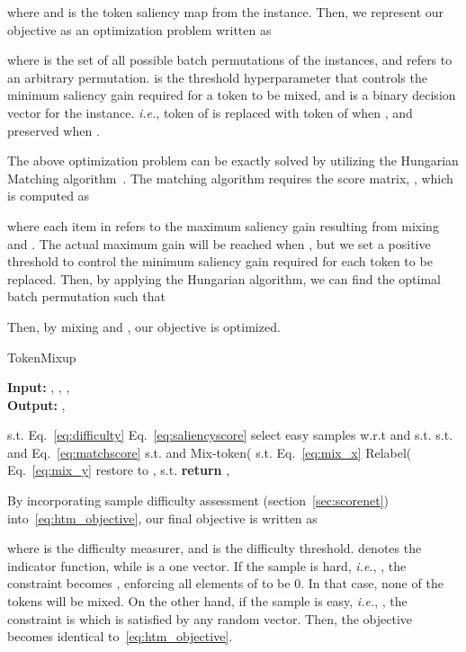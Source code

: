 \documentclass{article}
\begin{document}
where  and  is the token saliency map from the  instance.
Then, we represent our objective as an optimization problem written as

where  is the set of all possible batch permutations of the  instances, and  refers to an arbitrary permutation.
 is the threshold hyperparameter that controls the minimum saliency gain required for a token to be mixed, and  is a binary decision vector for the  instance. 
\textit{i.e.}, token  of  is replaced with token  of  when , and preserved when .

The above optimization problem can be exactly solved by utilizing the Hungarian Matching algorithm~\cite{munkres1957algorithms}.
The matching algorithm requires the score matrix, , which is computed as

where each item in  refers to the maximum saliency gain resulting from mixing  and .
The actual maximum gain will be reached when , but we set a positive threshold to control the minimum saliency gain required for each token to be replaced.
Then, by applying the Hungarian algorithm, we can find the optimal batch permutation  such that

Then, by mixing  and , our objective is optimized.


\begin{algorithm}[t]
\caption{TokenMixup}
\label{alg:htm_v2}
\textbf{Input:} , , , \\
\textbf{Output:} , 
\begin{algorithmic}[1]
    \State  s.t.   \hfill  Eq.~\eqref{eq:difficulty}
    \State \ell \hfill  Eq.~\eqref{eq:saliencyscore}
    \State  select easy samples w.r.t  and   \:\:\:\: s.t.  
    \State  s.t.  and  \hfill  Eq.~\eqref{eq:matchscore}
    \State  s.t.  and 
    \State  Mix-token( \:\:\:\: s.t.  \hfill  Eq.~\eqref{eq:mix_x}
    \State  Relabel( \hfill  Eq.~\eqref{eq:mix_y}
    \State restore  to ,  \:\:\:\: s.t. 
    \State \textbf{return } , 
\end{algorithmic}
\end{algorithm}  



 By incorporating sample difficulty assessment (section~\ref{sec:scorenet}) into~\eqref{eq:htm_objective}, our final objective is written as

where  is the difficulty measurer, and  is the difficulty threshold.
 denotes the indicator function, while  is a one vector.
If the sample is hard, \textit{i.e.}, , the constraint becomes , enforcing all elements of  to be 0. 
In that case, none of the tokens will be mixed.
On the other hand, if the sample is easy, \textit{i.e.}, , the constraint is  which is satisfied by any random  vector.
Then, the objective becomes identical to~\eqref{eq:htm_objective}.
 
\end{document}
